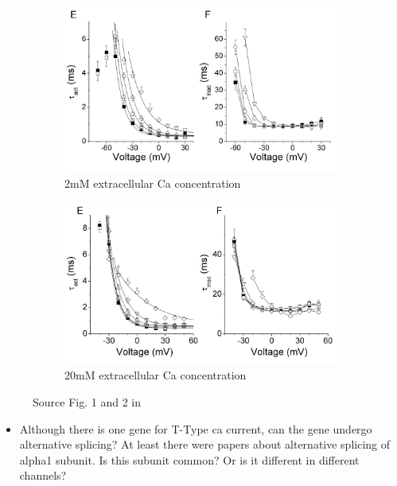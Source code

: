\documentclass[11pt]{article}
\begin{document}
\begin{figure}[H]
    \centering
    \begin{subfigure}[t]{0.48\textwidth}
        \centering
        \includegraphics[width=\textwidth]{./img/2025_01_15/ca_modul_of_t_type_talavera_2mm.png}
        \caption{2mM extracellular Ca concentration}
    \end{subfigure}
    \hfill
    \begin{subfigure}[t]{0.48\textwidth}
        \centering
        \includegraphics[width=\textwidth]{./img/2025_01_15/ca_modul_of_t_type_talavera_20mm.png}
        \caption{20mM extracellular Ca concentration}
    \end{subfigure}
    \label{fig:data_from_jeong}
    \caption{Source Fig. 1 and 2 in \parencite{talaveraExtracellularCa2Modulates2003}}
\end{figure}

\color{red}
\begin{itemize}
    \item Although there is one gene for T-Type ca current, can the gene undergo alternative
    splicing? At least there were papers about alternative splicing of alpha1 subunit.
    Is this subunit common? Or is it different in different channels?
\end{itemize}
\color{black}
\end{document}
